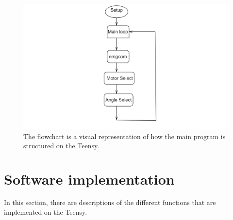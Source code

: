 \begin{figure}[H]
    \centering
    \includegraphics[width=\textwidth]{Figures/Technical_figures/diagen.png}
    \caption{The flowchart is a visual representation of how the main program is structured on the Teensy.}
    \label{fig:generalflowchart}
\end{figure}

\section{Software implementation}
In this section, there are descriptions of the different functions that are implemented on the Teensy. 
